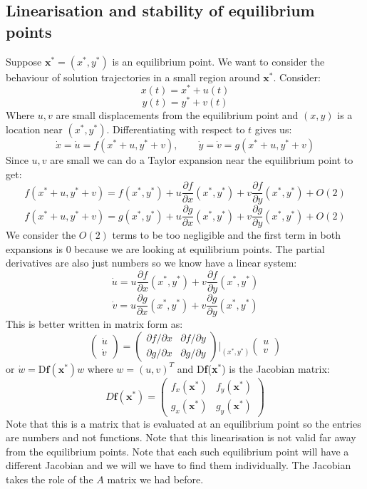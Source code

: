 \documentclass[12pt]{article}
\begin{document}
\subsection*{Linearisation and stability of equilibrium points}
Suppose \(\textbf{x}^*=(x^*,y^*)\) is an equilibrium point. We want to consider the behaviour of solution trajectories in a small region around \(\textbf{x}^*\). Consider:
\[x(t)=x^*+u(t)\]
\[y(t)=y^*+v(t)\]
Where \(u,v\) are small displacements from the equilibrium point and \((x,y)\) is a location near \((x^*,y^*)\). Differentiating with respect to \(t\) gives us:
\[\dot{x}=\dot{u}=f(x^*+u,y^*+v),\qquad\dot{y}=\dot{v}=g(x^*+u,y^*+v)\]
Since \(u,v\) are small we can do a Taylor expansion near the equilibrium point to get:
\[f(x^*+u,y^*+v)=f(x^*,y^*)+u\frac{\partial f}{\partial x}(x^*,y^*)+v\frac{\partial f}{\partial y}(x^*,y^*)+O(2)\]
\[f(x^*+u,y^*+v)=g(x^*,y^*)+u\frac{\partial g}{\partial x}(x^*,y^*)+v\frac{\partial g}{\partial y}(x^*,y^*)+O(2)\]
We consider the \(O(2)\) terms to be too negligible and the first term in both expansions is \(0\) because we are looking at equilibrium points. The partial derivatives are also just numbers so we know have a linear system:
\[\dot{u}=u\frac{\partial f}{\partial x}(x^*,y^*)+v\frac{\partial f}{\partial y}(x^*,y^*)\]
\[\dot{v}=u\frac{\partial g}{\partial x}(x^*,y^*)+v\frac{\partial g}{\partial y}(x^*,y^*)\]
This is better written in matrix form as:
\[\begin{pmatrix}
    \dot{u} \\
    \dot{v}
\end{pmatrix}=\begin{pmatrix}
    \partial f/\partial x & \partial f/\partial y \\
    \partial g/\partial x & \partial g/\partial y
\end{pmatrix}\biggr\rvert_{(x^*,y^*)}\begin{pmatrix}
    u \\ v
\end{pmatrix}\]
or \(\dot{w}=\text{D}\textbf{f}(\textbf{x}^*)w\) where \(w=(u,v)^T\) and D\textbf{f}(\textbf{x}\(^*\)) is the Jacobian matrix:
\[D\textbf{f}(\textbf{x}^*)=\begin{pmatrix}
    f_x(\textbf{x}^*) & f_y(\textbf{x}^*) \\
    g_x(\textbf{x}^*) & g_y(\textbf{x}^*)
\end{pmatrix}\]
Note that this is a matrix that is evaluated at an equilibrium point so the entries are numbers and not functions. Note that this linearisation is not valid far away from the equilibrium points. Note that each such equilibrium point will have a different Jacobian and we will we have to find them individually. The Jacobian takes the role of the \(A\) matrix we had before.
\end{document}
